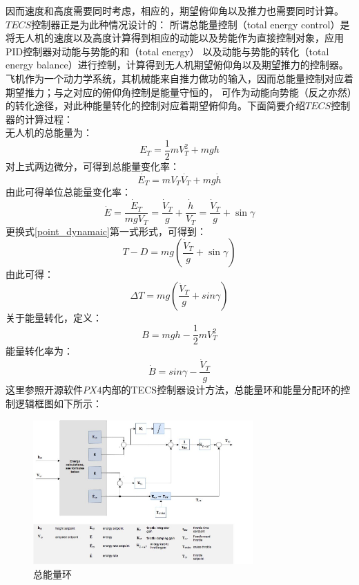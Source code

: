 因而速度和高度需要同时考虑，相应的，期望俯仰角以及推力也需要同时计算。$TECS$控制器正是为此种情况设计的：%
所谓总能量控制（total energy control）是将无人机的速度以及高度计算得到相应的动能以及势能作为直接控制对象，应用PID控制器对动能与势能的和（total energy）
以及动能与势能的转化（total energy balance）进行控制，计算得到无人机期望俯仰角以及期望推力的控制器。飞机作为一个动力学系统，其机械能来自推力做功的输入，因而总能量控制对应着期望推力；与之对应的俯仰角控制是能量守恒的，
可作为动能向势能（反之亦然）的转化途径，对此种能量转化的控制对应着期望俯仰角。下面简要介绍$TECS$控制器的计算过程：
\\
无人机的总能量为：
\begin{equation}
    E_T=\frac{1}{2}mV_T^2+mgh
    \label{ET}
\end{equation}
对上式两边微分，可得到总能量变化率：
\begin{equation}
    \dot{E_T}=mV_T\dot{V_T}+mg\dot{h}
    \label{ET_rate}
\end{equation}
由此可得单位总能量变化率：
\begin{equation}
    \dot{E}=\frac{\dot{E}_{T}}{m g V_{T}}=\frac{\dot{V}_{T}}{g}+\frac{\dot{h}}{V_{T}}=\frac{\dot{V}_{T}}{g}+\sin \gamma
    \label{specif_ET_rate}
\end{equation}
更换式\ref{point_dynamaic}第一式形式，可得到：
\begin{equation}
    T-D=m g\left(\frac{\dot{V}_{T}}{g}+\sin \gamma\right)
    \label{point_dynamaic_change}
\end{equation}
由此可得：
\begin{equation}
    \Delta T=m g\left(\frac{\dot{V}_{T}}{g}+sin\gamma\right)
    \label{thrust}
\end{equation}
关于能量转化，定义：
\begin{equation}
    B=m g h-\frac{1}{2} m V_{T}^{2}
\end{equation}
能量转化率为：
\begin{equation}
\dot{B}=sin\gamma-\frac{\dot{V}_{T}}{g}
\end{equation}
这里参照开源软件$PX4$内部的TECS控制器设计方法，总能量环和能量分配环的控制逻辑框图如下所示：
\begin{figure}[H]
    \centering
    \includegraphics[width=0.75\textwidth]{figures/c3/TECS_throttle.jpg}
    \caption{总能量环}\label{fig:total_energy}
\end{figure}
